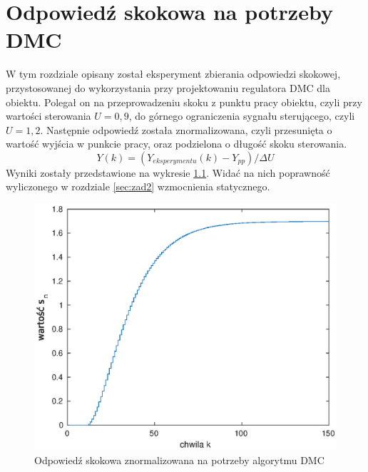 \chapter{Odpowiedź skokowa na potrzeby DMC}
W tym rozdziale opisany został eksperyment zbierania odpowiedzi skokowej,
przystosowanej do wykorzystania przy projektowaniu regulatora DMC dla obiektu.
Polegał on na przeprowadzeniu skoku z punktu pracy obiektu, czyli przy
wartości sterowania $U = 0,9$, do górnego ograniczenia sygnału sterującego,
czyli $U = 1,2$. Następnie odpowiedź została znormalizowana, czyli przesunięta
o wartość wyjścia w punkcie pracy, oraz podzielona o długość
skoku sterowania.
\begin{equation}
  Y(k) = (Y_{eksperymentu}(k) - Y_{pp})/\Delta U
\end{equation}
Wyniki zostały przedstawione na wykresie \ref{fig:skok_DMC}. Widać na nich
poprawność wyliczonego w rozdziale \ref{sec:zad2} wzmocnienia statycznego.
\begin{figure}
  \includegraphics{wykresy/3.eps}
  \caption{Odpowiedź skokowa znormalizowana na potrzeby algorytmu DMC}
  \label{fig:skok_DMC}
\end{figure}
